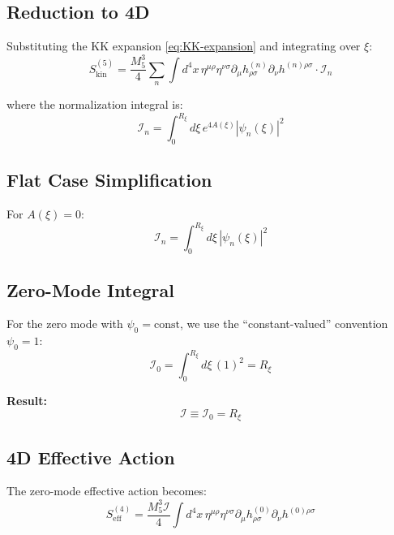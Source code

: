 \documentclass[11pt,a4paper]{article}
\newcommand{\Rxi}{R_\xi}
\newcommand{\Mfive}{M_5}
\newcommand{\calI}{\mathcal{I}}
\begin{document}
\subsection{Reduction to 4D}

Substituting the KK expansion \eqref{eq:KK-expansion} and integrating over $\xi$:
\begin{equation}
S_{\mathrm{kin}}^{(5)} = \frac{\Mfive^3}{4} \sum_n \int d^4x\, \eta^{\mu\rho}\eta^{\nu\sigma}
\partial_\mu h_{\rho\sigma}^{(n)} \partial_\nu h^{(n)\rho\sigma} \cdot \calI_n
\label{eq:kinetic-reduced}
\end{equation}

where the normalization integral is:
\begin{equation}
\calI_n = \int_0^{\Rxi} d\xi\, e^{4A(\xi)} |\psi_n(\xi)|^2
\label{eq:normalization-integral}
\end{equation}

\subsection{Flat Case Simplification}

For $A(\xi) = 0$:
\begin{equation}
\calI_n = \int_0^{\Rxi} d\xi\, |\psi_n(\xi)|^2
\label{eq:normalization-flat}
\end{equation}

\subsection{Zero-Mode Integral}

For the zero mode with $\psi_0 = \mathrm{const}$, we use the ``constant-valued''
convention $\psi_0 = 1$:
\begin{equation}
\calI_0 = \int_0^{\Rxi} d\xi\, (1)^2 = \Rxi
\label{eq:I0-calculation}
\end{equation}

\textbf{Result:}
\begin{equation}
\boxed{\calI \equiv \calI_0 = \Rxi}
\label{eq:I-equals-Rxi}
\end{equation}

\subsection{4D Effective Action}

The zero-mode effective action becomes:
\begin{equation}
S_{\mathrm{eff}}^{(4)} = \frac{\Mfive^3 \calI}{4} \int d^4x\, \eta^{\mu\rho}\eta^{\nu\sigma}
\partial_\mu h_{\rho\sigma}^{(0)} \partial_\nu h^{(0)\rho\sigma}
\label{eq:4D-effective}
\end{equation}
\end{document}
